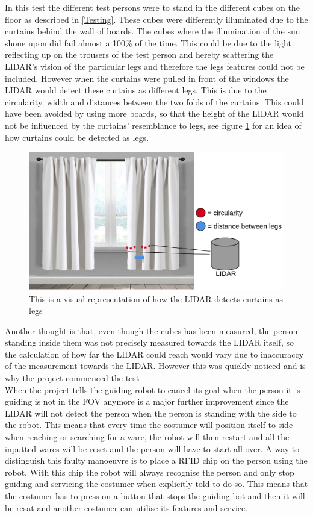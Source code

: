 In this test the different test persons were to stand in the different cubes on the floor as described in \ref{Testing}. These cubes were differently illuminated due to the curtains behind the wall of boards. The cubes where the illumination of the sun shone upon did fail almost a 100\% of the time. This could be due to the light reflecting up on the trousers of the test person and hereby scattering the LIDAR's vision of the particular legs and therefore the legs features could not be included. However when the curtains were pulled in front of the windows the LIDAR would detect these curtains as different legs. This is due to the circularity, width and distances between the two folds of the curtains. This could have been avoided by using more boards, so that the height of the LIDAR would not be influenced by the curtains' resemblance to legs, see figure \ref{fig:curtains} for an idea of how curtains could be detected as legs.\\

\begin{figure}[H]
    \centering
    \includegraphics[width=1\textwidth]{figures/curtain.png} 
    \caption{This is a visual representation of how the LIDAR detects curtains as legs}
    \label{fig:curtains}
\end{figure}

Another thought is that, even though the cubes has been measured, the person standing inside them was not precisely measured towards the LIDAR itself, so the calculation of how far the LIDAR could reach would vary due to inaccuraccy of the measurement towards the LIDAR. However this was quickly noticed and is why the project commenced the test %
\\
When the project tells the guiding robot to cancel its goal when the person it is guiding is not in the FOV anymore is a major further improvement since the LIDAR will not detect the person when the person is standing with the side to the robot. This means that every time the costumer will position itself to side when reaching or searching for a ware, the robot will then restart and all the inputted wares will be reset and the person will have to start all over. A way to distinguish this faulty manoeuvre is to place a RFID chip on the person using the robot. With this chip the robot will always recognise the person and only stop guiding and servicing the costumer when explicitly told to do so. This means that the costumer has to press on a button that stops the guiding bot and then it will be resat and another costumer can utilise its features and service. 

